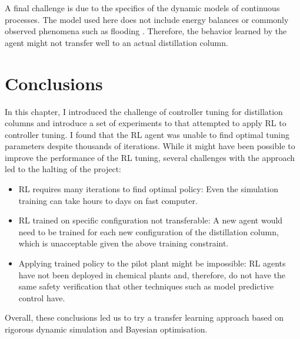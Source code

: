 A final challenge is due to the specifics of the dynamic models of continuous processes. The model used here does not include energy balances or commonly observed phenomena such as flooding \cite{Nooraii1998}. Therefore, the behavior learned by the agent might not transfer well to an actual distillation column.

\section{Conclusions}

In this chapter, I introduced the challenge of controller tuning for distillation columns and introduce a set of experiments to that attempted to apply RL to controller tuning. I found that the RL agent was unable to find optimal tuning parameters despite thousands of iterations. While it might have been  possible to improve the performance of the RL tuning, several challenges with the approach led to the halting of the project:

\begin{itemize}
    \item RL requires many iterations to find optimal policy: Even the simulation training can take hours to days on fast computer.
    \item RL trained on specific configuration not transferable: A new agent would need to be trained for each new configuration of the distillation column, which is unacceptable given the above training constraint.
    \item Applying trained policy to the pilot plant might be impossible: RL agents have not been deployed in chemical plants and, therefore, do not have the same safety verification that other techniques such as model predictive control have. 
\end{itemize}

 Overall, these conclusions led us to try a transfer learning approach based on rigorous dynamic simulation and Bayesian optimisation.
